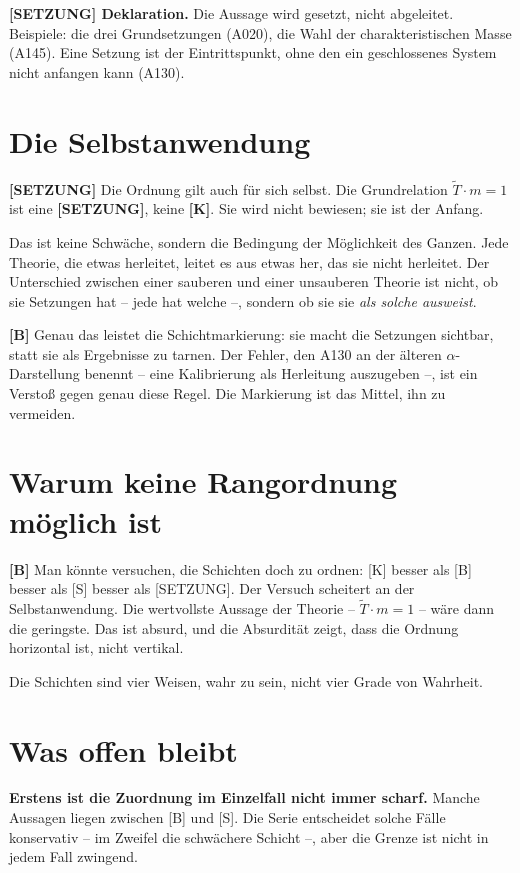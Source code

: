 \textbf{[SETZUNG] Deklaration.} Die Aussage wird gesetzt, nicht abgeleitet.
Beispiele: die drei Grundsetzungen (A020), die Wahl der charakteristischen Masse
(A145). Eine Setzung ist der Eintrittspunkt, ohne den ein geschlossenes System
nicht anfangen kann (A130).

\section{Die Selbstanwendung}

\textbf{[SETZUNG]} Die Ordnung gilt auch für sich selbst. Die Grundrelation
$\tilde T\cdot m = 1$ ist eine \textbf{[SETZUNG]}, keine \textbf{[K]}. Sie wird
nicht bewiesen; sie ist der Anfang.

Das ist keine Schwäche, sondern die Bedingung der Möglichkeit des Ganzen. Jede
Theorie, die etwas herleitet, leitet es aus etwas her, das sie nicht herleitet.
Der Unterschied zwischen einer sauberen und einer unsauberen Theorie ist nicht,
ob sie Setzungen hat -- jede hat welche --, sondern ob sie sie \emph{als solche
ausweist}.

\textbf{[B]} Genau das leistet die Schichtmarkierung: sie macht die Setzungen
sichtbar, statt sie als Ergebnisse zu tarnen. Der Fehler, den A130 an der
älteren $\alpha$-Darstellung benennt -- eine Kalibrierung als Herleitung
auszugeben --, ist ein Verstoß gegen genau diese Regel. Die Markierung ist das
Mittel, ihn zu vermeiden.

\section{Warum keine Rangordnung möglich ist}

\textbf{[B]} Man könnte versuchen, die Schichten doch zu ordnen: [K] besser als
[B] besser als [S] besser als [SETZUNG]. Der Versuch scheitert an der
Selbstanwendung. Die wertvollste Aussage der Theorie -- $\tilde T\cdot m = 1$ --
wäre dann die geringste. Das ist absurd, und die Absurdität zeigt, dass die
Ordnung horizontal ist, nicht vertikal.

Die Schichten sind vier Weisen, wahr zu sein, nicht vier Grade von Wahrheit.

\section{Was offen bleibt}

\textbf{Erstens ist die Zuordnung im Einzelfall nicht immer scharf.} Manche
Aussagen liegen zwischen [B] und [S]. Die Serie entscheidet solche Fälle
konservativ -- im Zweifel die schwächere Schicht --, aber die Grenze ist nicht
in jedem Fall zwingend.

